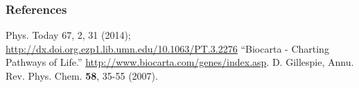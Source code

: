 \documentclass[xcolor={usenames,dvipsnames,svgnames}]{beamer}
\begin{document}
\appendix

\begin{frame}
    \frametitle{References}
    \begin{thebibliography}{9}
         Phys. Today 67, 2, 31 (2014); \url{http://dx.doi.org.ezp1.lib.umn.edu/10.1063/PT.3.2276}
         ``Biocarta - Charting Pathways of Life.'' \url{http://www.biocarta.com/genes/index.asp}.
         D. Gillespie, Annu. Rev. Phys. Chem. \textbf{58}, 35-55 (2007).
    \end{thebibliography}
\end{frame}
\end{document}
